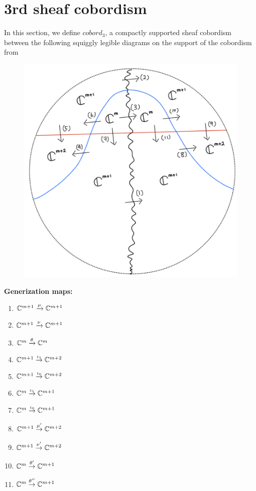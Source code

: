 \section{3rd sheaf cobordism}
In this section, we define $cobord_3$, a compactly supported sheaf 	cobordism between the following squiggly legible diagrams on the support of the cobordism from
\begin{figure}[H]
    \centering
    \includegraphics[scale = 0.45]{diagrams/lemma3/21.png} 
    \caption{}
    \label{fig:your-label}
\end{figure}
\textbf{Generization maps:}
\begin{enumerate}[label = (\arabic*)]
\item $\mathbb{C}^{m+1} \xrightarrow{\mu} \mathbb{C}^{m+1}$

\item $\mathbb{C}^{m+1} \xrightarrow{\nu} \mathbb{C}^{m+1}$

\item $\mathbb{C}^{m} \xrightarrow{\theta} \mathbb{C}^{m}$

\item $\mathbb{C}^{m+1} \overset{\iota_1}{\rightarrow} \mathbb{C}^{m+2}$

\item $\mathbb{C}^{m+1} \overset{\iota_0}{\rightarrow} \mathbb{C}^{m+2}$

\item $\mathbb{C}^{m} \overset{\iota_1}{\rightarrow} \mathbb{C}^{m+1}$

\item $\mathbb{C}^{m} \overset{\iota_0}{\rightarrow} \mathbb{C}^{m+1}$

\item $\mathbb{C}^{m+1} \overset{\mu'}{\rightarrow} \mathbb{C}^{m+2}$

\item $\mathbb{C}^{m+1} \overset{\nu'}{\rightarrow} \mathbb{C}^{m+2}$

\item $\mathbb{C}^{m} \overset{\theta'}{\rightarrow} \mathbb{C}^{m+1}$

\item $\mathbb{C}^{m} \overset{\theta''}{\rightarrow} \mathbb{C}^{m+1}$
\end{enumerate}
